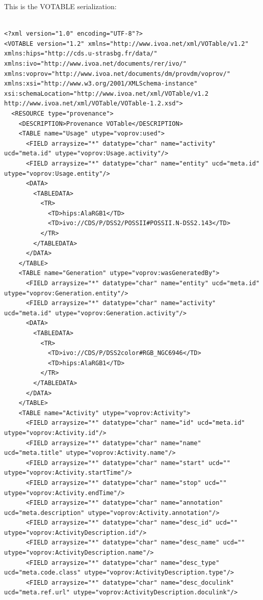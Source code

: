This is the VOTABLE serialization:

\begin{verbatim}

<?xml version="1.0" encoding="UTF-8"?>
<VOTABLE version="1.2" xmlns="http://www.ivoa.net/xml/VOTable/v1.2" xmlns:hips="http://cds.u-strasbg.fr/data/" xmlns:ivo="http://www.ivoa.net/documents/rer/ivo/" xmlns:voprov="http://www.ivoa.net/documents/dm/provdm/voprov/" xmlns:xsi="http://www.w3.org/2001/XMLSchema-instance" xsi:schemaLocation="http://www.ivoa.net/xml/VOTable/v1.2 http://www.ivoa.net/xml/VOTable/VOTable-1.2.xsd">
  <RESOURCE type="provenance">
    <DESCRIPTION>Provenance VOTable</DESCRIPTION>
    <TABLE name="Usage" utype="voprov:used">
      <FIELD arraysize="*" datatype="char" name="activity" ucd="meta.id" utype="voprov:Usage.activity"/>
      <FIELD arraysize="*" datatype="char" name="entity" ucd="meta.id" utype="voprov:Usage.entity"/>
      <DATA>
        <TABLEDATA>
          <TR>
            <TD>hips:AlaRGB1</TD>
            <TD>ivo://CDS/P/DSS2/POSSII#POSSII.N-DSS2.143</TD>
          </TR>
        </TABLEDATA>
      </DATA>
    </TABLE>
    <TABLE name="Generation" utype="voprov:wasGeneratedBy">
      <FIELD arraysize="*" datatype="char" name="entity" ucd="meta.id" utype="voprov:Generation.entity"/>
      <FIELD arraysize="*" datatype="char" name="activity" ucd="meta.id" utype="voprov:Generation.activity"/>
      <DATA>
        <TABLEDATA>
          <TR>
            <TD>ivo://CDS/P/DSS2color#RGB_NGC6946</TD>
            <TD>hips:AlaRGB1</TD>
          </TR>
        </TABLEDATA>
      </DATA>
    </TABLE>
    <TABLE name="Activity" utype="voprov:Activity">
      <FIELD arraysize="*" datatype="char" name="id" ucd="meta.id" utype="voprov:Activity.id"/>
      <FIELD arraysize="*" datatype="char" name="name" ucd="meta.title" utype="voprov:Activity.name"/>
      <FIELD arraysize="*" datatype="char" name="start" ucd="" utype="voprov:Activity.startTime"/>
      <FIELD arraysize="*" datatype="char" name="stop" ucd="" utype="voprov:Activity.endTime"/>
      <FIELD arraysize="*" datatype="char" name="annotation" ucd="meta.description" utype="voprov:Activity.annotation"/>
      <FIELD arraysize="*" datatype="char" name="desc_id" ucd="" utype="voprov:ActivityDescription.id"/>
      <FIELD arraysize="*" datatype="char" name="desc_name" ucd="" utype="voprov:ActivityDescription.name"/>
      <FIELD arraysize="*" datatype="char" name="desc_type" ucd="meta.code.class" utype="voprov:ActivityDescription.type"/>
      <FIELD arraysize="*" datatype="char" name="desc_doculink" ucd="meta.ref.url" utype="voprov:ActivityDescription.doculink"/>

\end{verbatim}
